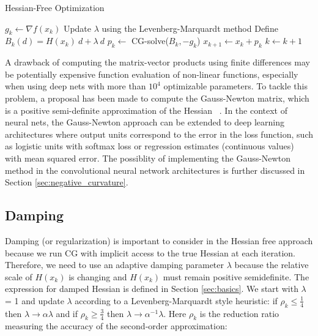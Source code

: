 \documentclass[10pt,twocolumn,letterpaper]{article}
\begin{document}

\begin{algorithm}
\caption{Hessian-Free Optimization}
\label{alg:hessian-free}
  \begin{algorithmic}[1]
   
      \State $g_k \gets \nabla f (x_k)$
        \State Update $\lambda $ using the Levenberg-Marquardt method
        \State Define $B_k (d) = H(x_k) \: d + \lambda \:d$
        \State $p_k \gets$ CG-solve($B_k, -g_k$)
        \State $x_{k+1} \gets x_k + p_k$
        \State $k \gets k + 1$
    \EndFor
  \end{algorithmic}
\end{algorithm}

A drawback of computing the matrix-vector products using finite differences may be potentially expensive function evaluation of non-linear functions, especially when using deep nets with more than $10^4$ optimizable parameters. To tackle this problem, a proposal has been made to compute the Gauss-Newton matrix, which is a positive semi-definite approximation of the Hessian ~\cite{Schraudolph02, Dauphin14, Mertens10}. In the context of neural nets, the Gauss-Newton approach can be extended to deep learning architectures where output units correspond to the error in the loss function, such as logistic units with softmax loss or regression estimates (continuous values) with mean squared error. The possiblity of implementing the Gauss-Newton method in the convolutional neural network architectures is further discussed in Section \ref{sec:negative_curvature}.


\subsection{Damping}
\label{sec:damping}

Damping (or regularization) is important to consider in the Hessian free approach because we run CG with implicit access to the true Hessian at each iteration. Therefore, we need to use an adaptive damping parameter $\lambda$ because the relative scale of $H(x_k)$ is changing and $H(x_k)$ must remain positive semidefinite. The expression for damped Hessian is defined in Section \ref{sec:basics}. We start with $\lambda$ = 1 and update $\lambda$ according to a Levenberg-Marquardt style heuristic: if $\rho_k  \leq \frac{1}{4}$ then $\lambda \rightarrow \alpha  \lambda$ and if $ \rho_k  \geq \frac{3}{4} $ then $ \lambda \rightarrow \alpha^{-1}  \lambda$. Here $\rho_k$ is the reduction ratio measuring the accuracy of the second-order approximation:
\end{document}

